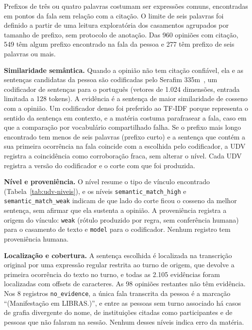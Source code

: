 Prefixos de três ou quatro palavras costumam ser expressões comuns, encontradas em pontos da fala sem
relação com a citação. O limite de seis palavras foi definido a partir de uma leitura exploratória
dos casamentos agrupados por tamanho de prefixo, sem protocolo de anotação. Das 960 opiniões com
citação, 549 têm algum prefixo encontrado na fala da pessoa e 277 têm prefixo de seis palavras ou
mais.

\textbf{Similaridade semântica.} Quando a opinião não tem citação confiável, ela e as sentenças
candidatas da pessoa são codificadas pelo Serafim 335m~\citep{gomes2024serafim}, um codificador de
sentenças para o português (vetores de 1.024 dimensões, entrada limitada a 128 tokens). A evidência é
a sentença de maior similaridade de cosseno com a opinião. Um codificador denso foi preferido ao
TF-IDF porque representa o sentido da sentença em contexto, e a matéria costuma parafrasear a fala,
caso em que a comparação por vocabulário compartilhado falha. Se o prefixo mais longo encontrado tem
menos de seis palavras (prefixo curto) e a sentença que contém a sua primeira ocorrência na fala coincide com a
escolhida pelo codificador, a UDV registra a coincidência como corroboração fraca, sem alterar o
nível. Cada UDV registra a versão do codificador e o corte com que foi produzida.

\textbf{Nível e proveniência.} O nível resume o tipo de vínculo encontrado
(Tabela~\ref{tab:udv-niveis}), e os níveis \texttt{semantic\_match\_high} e
\texttt{semantic\_match\_weak} indicam de que lado do corte ficou o cosseno da melhor sentença, sem
afirmar que ela sustenta a opinião. A proveniência registra a origem do vínculo: \texttt{weak}
(rótulo produzido por regra, sem conferência humana) para o casamento de texto e \texttt{model} para
o codificador. Nenhum registro tem proveniência humana.

\textbf{Localização e cobertura.} A sentença escolhida é localizada na transcrição original por uma
expressão regular restrita ao turno de origem, que devolve a primeira ocorrência do texto no turno, e
todas as 2.105 evidências foram localizadas com offsets de caracteres. As 98 opiniões restantes não
têm evidência. Nos 8 registros \texttt{no\_evidence}, a única fala transcrita da pessoa é a marcação
``(Manifestação em LIBRAS.)'', e entre as pessoas sem turno associado há casos de grafia divergente do
nome, de instituições citadas como participantes e de pessoas que não falaram na sessão. Nenhum
desses níveis indica erro da matéria.



